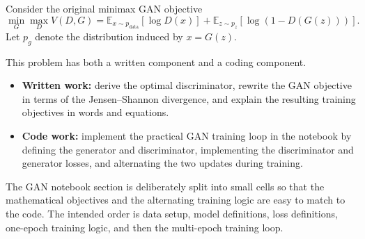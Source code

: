 \documentclass[submit]{../harvardml}
\begin{document}
\begin{problem}[GANs]
Consider the original minimax GAN objective
\[
\min_G \max_D V(D,G) = \mathbb E_{x\sim p_{\mathrm{data}}}[\log D(x)] + \mathbb E_{z\sim p_z}[\log(1-D(G(z)))] .
\]
Let \(p_g\) denote the distribution induced by \(x = G(z)\).

This problem has both a written component and a coding component.

\begin{itemize}[leftmargin=*]
    \item \textbf{Written work:} derive the optimal discriminator, rewrite the GAN objective in terms of the Jensen--Shannon divergence, and explain the resulting training objectives in words and equations.
    \item \textbf{Code work:} implement the practical GAN training loop in the notebook by defining the generator and discriminator, implementing the discriminator and generator losses, and alternating the two updates during training.
\end{itemize}

The GAN notebook section is deliberately split into small cells so that the mathematical objectives and the alternating training logic are easy to match to the code. The intended order is data setup, model definitions, loss definitions, one-epoch training logic, and then the multi-epoch training loop.


\end{problem}
\end{document}
